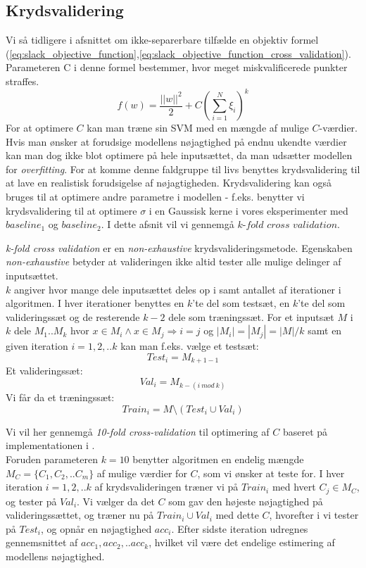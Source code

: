 \documentclass{article}
\begin{document}
\subsection{Krydsvalidering}
Vi så tidligere i afsnittet om ikke-separerbare tilfælde en objektiv formel (\ref{eq:slack_objective_function},\ref{eq:slack_objective_function_cross_validation}). Parameteren C i denne formel bestemmer, hvor meget miskvalificerede punkter straffes. 
\begin{equation}
f(w) = \frac{||w||^2}{2}+C(\sum\limits_{i=1}^N \xi_i)^k
\label{eq:slack_objective_function_cross_validation}
\end{equation}
For at optimere $C$ kan man træne sin SVM med en mængde af mulige $C$-værdier. Hvis man ønsker at forudsige modellens nøjagtighed på endnu ukendte værdier kan man dog ikke blot optimere på hele inputsættet, da man udsætter modellen for \textit{overfitting}. For at komme denne faldgruppe til livs benyttes krydsvalidering til at lave en realistisk forudsigelse af nøjagtigheden. Krydsvalidering kan også bruges til at optimere andre parametre i modellen - f.eks. benytter vi krydsvalidering til at optimere $\sigma$ i en Gaussisk kerne i vores eksperimenter med $baseline_1$ og $baseline_2$. I dette afsnit vil vi gennemgå $\textit{k-fold cross validation}$.

\textit{k-fold cross validation} er en \textit{non-exhaustive} krydsvalideringsmetode. Egenskaben \textit{non-exhaustive} betyder at valideringen ikke altid tester alle mulige delinger af inputsættet.\\
$k$ angiver hvor mange dele inputsættet deles op i samt antallet af iterationer i algoritmen. I hver iterationer benyttes en $k$'te del som testsæt, en $k$'te del som valideringssæt og de resterende $k-2$ dele som træningssæt. For et inputsæt $M$ i $k$ dele $M_1..M_k$ hvor $x\in M_i \land x\in M_j \Rightarrow i=j$ og $|M_i|=|M_j|=|M|/k$ samt en given iteration $i=1,2,..k$ kan man f.eks. vælge et testsæt:
\begin{equation}
\label{eq:cv_test}
Test_i = M_{k+1-1}
\end{equation}
Et valideringssæt:
\begin{equation}
\label{eq:cv_val}
Val_i = M_{k-(i\ mod\ k)}
\end{equation}
Vi får da et træningssæt:
\begin{equation}
Train_i = M\setminus \left(Test_i\cup Val_i\right)
\end{equation}

Vi vil her gennemgå \textit{10-fold cross-validation} til optimering af $C$ baseret på implementationen i \cite{libsvm}.\\
Foruden parameteren $k=10$ benytter algoritmen en endelig mængde $M_C=\{C_1,C_2,..C_m\}$ af mulige værdier for $C$, som vi ønsker at teste for. I hver iteration $i=1,2,..k$ af krydsvalideringen træner vi på $Train_i$ med hvert $C_j\in M_C$, og tester på $Val_i$. Vi vælger da det $C$ som gav den højeste nøjagtighed på valideringssættet, og træner nu på $Train_i\cup Val_i$ med dette $C$, hvorefter i vi tester på $Test_i$, og opnår en nøjagtighed $acc_i$. Efter sidste iteration udregnes gennemsnittet af $acc_1,acc_2,..acc_k$, hvilket vil være det endelige estimering af modellens nøjagtighed.
\end{document}
